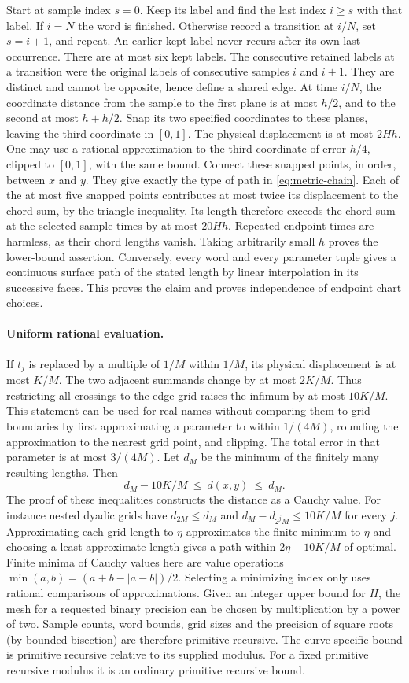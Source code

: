 \documentclass[10pt,letterpaper]{article}
\begin{document}
Start at sample index $s=0$. Keep its label and find the last index
$i\ge s$ with that label. If $i=N$ the word is finished. Otherwise
record a transition at $i/N$, set $s=i+1$, and repeat. An earlier kept
label never recurs after its own last occurrence. There are at most
six kept labels. The consecutive retained labels at a transition were
the original labels of consecutive samples $i$ and $i+1$. They are
distinct and cannot be opposite, hence define a shared edge. At time
$i/N$, the coordinate distance from the sample to the first plane
is at most $h/2$, and to the second at most $h+h/2$. Snap its two
specified coordinates to these planes, leaving the third coordinate in
$[0,1]$. The physical displacement is at most $2Hh$. One may use a
rational approximation to the third coordinate of error $h/4$,
clipped to $[0,1]$, with the same bound. Connect these snapped points,
in order, between $x$ and $y$. They give exactly the type of path in
\eqref{eq:metric-chain}. Each of the at most five snapped points
contributes at most twice its displacement to the chord sum, by the
triangle inequality. Its length therefore exceeds the chord sum at
the selected sample times by at most $20Hh$. Repeated endpoint times
are harmless, as their chord lengths vanish. Taking arbitrarily small
$h$ proves the lower-bound assertion. Conversely, every word and every
parameter tuple gives a continuous surface path of the stated length by
linear interpolation in its successive faces. This proves the claim
and proves independence of endpoint chart choices.

\paragraph{Uniform rational evaluation.}
If $t_j$ is replaced by a multiple of $1/M$ within $1/M$, its physical
displacement is at most $K/M$. The two adjacent summands change by at
most $2K/M$. Thus restricting all crossings to the edge grid raises the
infimum by at most $10K/M$. This statement can be used for real names
without comparing them to grid boundaries by first approximating a parameter
to within $1/(4M)$, rounding the approximation to the nearest grid point,
and clipping. The total error in that parameter is at most $3/(4M)$.
Let $d_M$ be the minimum of the finitely many resulting lengths. Then
\[
     d_M-10K/M\ \le\ d(x,y)\ \le\ d_M .
\]
The proof of these inequalities constructs the distance as a Cauchy
value. For instance nested dyadic grids have $d_{2M}\le d_M$ and
$d_M-d_{2^jM}\le10K/M$ for every $j$. Approximating each grid length
to $\eta$ approximates the finite minimum to $\eta$ and choosing a
least approximate length gives a path within $2\eta+10K/M$ of optimal.
Finite minima of Cauchy values here are value operations
$\min(a,b)=(a+b-|a-b|)/2$. Selecting a minimizing index only uses
rational comparisons of approximations. Given an integer upper bound
for $H$, the mesh for a requested binary precision can be chosen by
multiplication by a power of two. Sample counts, word bounds, grid
sizes and the precision of square roots (by bounded bisection) are
therefore primitive recursive. The curve-specific bound is primitive
recursive relative to its supplied modulus. For a fixed primitive
recursive modulus it is an ordinary primitive recursive bound.
\end{document}
